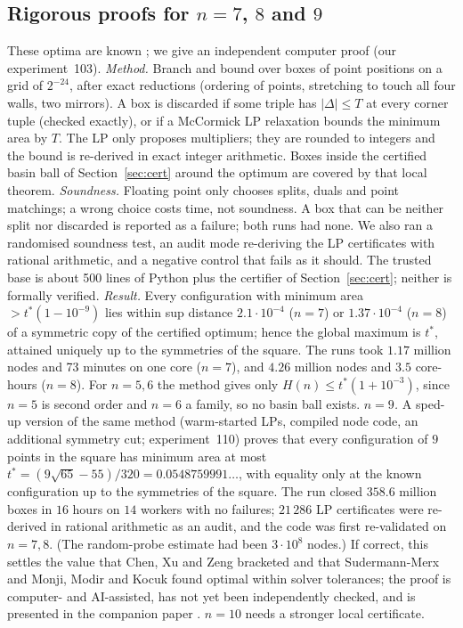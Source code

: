 \documentclass[11pt]{amsart}
\theoremstyle{definition}
\begin{document}
\subsection{Rigorous proofs for \texorpdfstring{$n = 7$, $8$ and $9$}{n = 7, 8 and 9}}
These optima are known \cite{ZC,DZ}; we give an independent computer proof (our experiment~103). %
\emph{Method.} Branch and bound over boxes of point positions on a grid of $2^{-24}$, after exact reductions (ordering of points, stretching to touch all four walls, two mirrors). A box is discarded if some triple has $\lvert\Delta\rvert \le T$ at every corner tuple (checked exactly), or if a McCormick LP relaxation bounds the minimum area by $T$. The LP only proposes multipliers; they are rounded to integers and the bound is re-derived in exact integer arithmetic. Boxes inside the certified basin ball of Section~\ref{sec:cert} around the optimum are covered by that local theorem.
\emph{Soundness.} Floating point only chooses splits, duals and point matchings; a wrong choice costs time, not soundness. A box that can be neither split nor discarded is reported as a failure; both runs had none. We also ran a randomised soundness test, an audit mode re-deriving the LP certificates with rational arithmetic, and a negative control that fails as it should. The trusted base is about 500 lines of Python plus the certifier of Section~\ref{sec:cert}; neither is formally verified.
\emph{Result.} Every configuration with minimum area $> t^*(1-10^{-9})$ lies within sup distance $2.1\cdot10^{-4}$ ($n = 7$) or $1.37\cdot10^{-4}$ ($n = 8$) of a symmetric copy of the certified optimum; hence the global maximum is $t^*$, attained uniquely up to the symmetries of the square. The runs took $1.17$ million nodes and 73 minutes on one core ($n = 7$), and $4.26$ million nodes and $3.5$ core-hours ($n = 8$). For $n = 5, 6$ the method gives only $H(n) \le t^*(1+10^{-3})$, since $n = 5$ is second order and $n = 6$ a family, so no basin ball exists.
\emph{$n = 9$.} A sped-up version of the same method (warm-started LPs, compiled node code, an additional symmetry cut; experiment~110) proves that every configuration of $9$ points in the square has minimum area at most $t^* = (9\sqrt{65}-55)/320 = 0.0548759991\ldots$, with equality only at the known configuration up to the symmetries of the square. The run closed $358.6$ million boxes in $16$ hours on $14$ workers with no failures; $21\,286$ LP certificates were re-derived in rational arithmetic as an audit, and the code was first re-validated on $n = 7, 8$. (The random-probe estimate had been $3\cdot10^8$ nodes.) If correct, this settles the value that Chen, Xu and Zeng \cite{Chen17} bracketed and that Sudermann-Merx \cite{SM} and Monji, Modir and Kocuk \cite{MMK} found optimal within solver tolerances; the proof is computer- and AI-assisted, has not yet been independently checked, and is presented in the companion paper \cite{N9}. $n = 10$ needs a stronger local certificate. %
\end{document}
